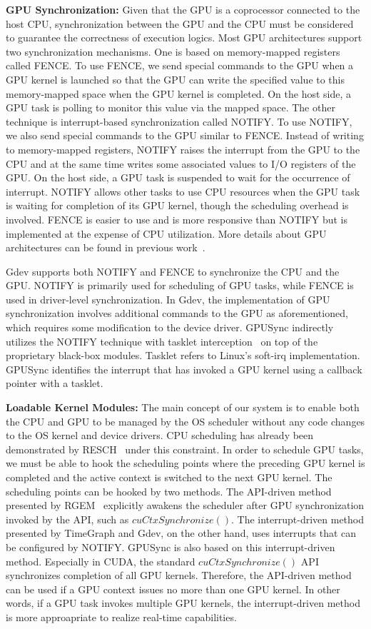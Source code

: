 \textbf{GPU Synchronization:}
Given that the GPU is a coprocessor connected to the host CPU,
synchronization between the GPU and the CPU must be considered to
guarantee the correctness of execution logics.
Most GPU architectures support two synchronization mechanisms.
One is based on memory-mapped registers called FENCE.
To use FENCE, we send special commands to the GPU when a GPU kernel is
launched so that the GPU can write the specified value to this
memory-mapped space when the GPU kernel is completed. 
On the host side, a GPU task is polling to monitor this value via the
mapped space.
The other technique is interrupt-based synchronization called NOTIFY.
To use NOTIFY, we also send special commands to the GPU similar to
FENCE.
Instead of writing to memory-mapped registers, NOTIFY raises the
interrupt from the GPU to the CPU and at the same time writes some
associated values to I/O registers of the GPU.
On the host side, a GPU task is suspended to wait for the occurrence of
interrupt.
NOTIFY allows other tasks to use CPU resources when the GPU task is
waiting for completion of its GPU kernel, though the scheduling overhead
is involved.
FENCE is easier to use and is more responsive than NOTIFY but is
implemented at the expense of CPU utilization.
More details about GPU architectures can be found in previous
work~\cite{kato:timegraph, kato:gdev, fujii:apsys2013}.

Gdev supports both NOTIFY and FENCE to synchronize the CPU and the GPU.
NOTIFY is primarily used for scheduling of GPU tasks, while FENCE is
used in driver-level synchronization. 
In Gdev, the implementation of GPU synchronization involves additional
commands to the GPU as aforementioned, which requires some modification
to the device driver.
GPUSync indirectly utilizes the NOTIFY technique with tasklet
interception~\cite{elliott2012robust} on top of the proprietary
black-box modules.
Tasklet refers to Linux's soft-irq implementation.
GPUSync identifies the interrupt that has invoked a GPU kernel using a
callback pointer with a tasklet.

\textbf{Loadable Kernel Modules:}
The main concept of our system is to enable both the CPU and GPU to be
managed by the OS scheduler without any code changes to the OS kernel
and device drivers.
CPU scheduling has already been demonstrated by
RESCH~\cite{kato2009loadable, asberg2012exsched} under this constraint.
In order to schedule GPU tasks, we must be able to hook the scheduling
points where the preceding GPU kernel is completed and the active
context is switched to the next GPU kernel.
The scheduling points can be hooked by two methods.
The API-driven method presented by RGEM~\cite{kato:rgem} explicitly
awakens the scheduler after GPU synchronization invoked by the API, such
as $cuCtxSynchronize()$.
The interrupt-driven method presented by TimeGraph and Gdev, on the
other hand, uses interrupts that can be configured by NOTIFY.
GPUSync is also based on this interrupt-driven method.
Especially in CUDA, the standard $cuCtxSynchronize()$ API synchronizes
completion of all GPU kernels.
Therefore, the API-driven method can be used if a GPU context issues no
more than one GPU kernel.
In other words, if a GPU task invokes multiple GPU kernels, the
interrupt-driven method is more approapriate to realize real-time
capabilities.

